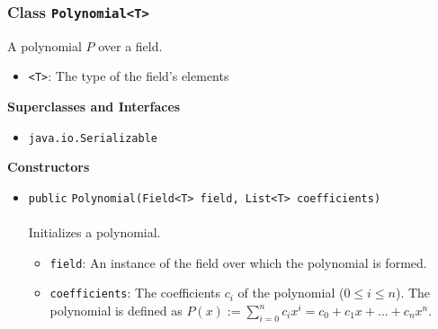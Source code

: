 \subsubsection{Class \lstinline|Polynomial<T>|}
A polynomial $P$ over a field. \\
\noindent\begin{minipage}[t]{5cm}
\vspace{0.3em}
\hspace*{2em}
\vspace{0.3em}
\end{minipage}

\begin{itemize}
\item \lstinline|<T>|: The type of the field's elements
\end{itemize}


\textbf{\sffamily Superclasses and Interfaces}
\begin{itemize}
\item \lstinline|java.io.Serializable|
\end{itemize}


\textbf{\sffamily Constructors}
\begin{itemize}
\item \lstinline|public| \lstinline|Polynomial|\lstinline|(Field<T> field, List<T> coefficients)|\\ \\[-0.6em]
Initializes a polynomial.
\begin{itemize}
\item \lstinline|field|: An instance of the field over which the polynomial is formed.
\item \lstinline|coefficients|: The coefficients $c_i$ of the polynomial ($0 \leq i \leq n$).
 The polynomial is defined as $P(x) := \sum_{i=0}^n c_i x^i = c_0 + c_1
 x + ... + c_n x^n$.
\end{itemize}



\end{itemize}


